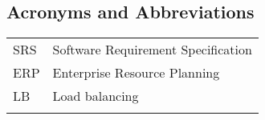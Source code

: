 \begin{center}
\section*{Acronyms and Abbreviations}
\end{center}


\begin{tabular}{p{3cm}p{11cm}}
SRS & Software Requirement Specification \\
ERP & Enterprise Resource Planning \\
LB & Load balancing \\
\\
\end{tabular}
